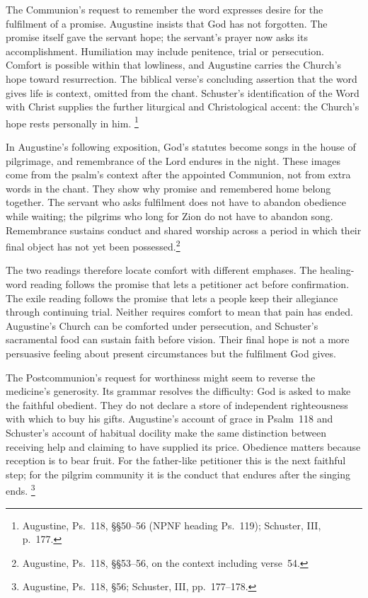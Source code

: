 The Communion's request to remember the word expresses desire for
the fulfilment of a promise. Augustine insists that God has not
forgotten. The promise itself gave the servant hope; the servant's
prayer now asks its accomplishment. Humiliation may include penitence,
trial or persecution. Comfort is possible within that lowliness,
and Augustine carries the Church's hope toward resurrection. The
biblical verse's concluding assertion that the word gives life is
context, omitted from the chant. Schuster's identification of the
Word with Christ supplies the further liturgical and Christological
accent: the Church's hope rests personally in him.
\footnote{Augustine, Ps.~118, \S\S50--56 (NPNF heading Ps.~119);
Schuster, III, p.~177.}

In Augustine's following exposition, God's statutes become songs in
the house of pilgrimage, and remembrance of the Lord endures in the
night. These images come from the psalm's context after the appointed
Communion, not from extra words in the chant. They show why promise
and remembered home belong together. The servant who asks fulfilment
does not have to abandon obedience while waiting; the pilgrims who
long for Zion do not have to abandon song. Remembrance sustains
conduct and shared worship across a period in which their final
object has not yet been possessed.\footnote{Augustine, Ps.~118,
\S\S53--56, on the context including verse~54.}

The two readings therefore locate comfort with different emphases.
The healing-word reading follows the promise that lets a petitioner
act before confirmation. The exile reading follows the promise that
lets a people keep their allegiance through continuing trial. Neither
requires comfort to mean that pain has ended. Augustine's Church can
be comforted under persecution, and Schuster's sacramental food can
sustain faith before vision. Their final hope is not a more persuasive
feeling about present circumstances but the fulfilment God gives.

The Postcommunion's request for worthiness might seem to reverse
the medicine's generosity. Its grammar resolves the difficulty:
God is asked to make the faithful obedient. They do not declare a
store of independent righteousness with which to buy his gifts.
Augustine's account of grace in Psalm~118 and Schuster's account of
habitual docility make the same distinction between receiving help
and claiming to have supplied its price. Obedience matters because
reception is to bear fruit. For the father-like petitioner this is
the next faithful step; for the pilgrim community it is the conduct
that endures after the singing ends.
\footnote{Augustine, Ps.~118, \S56; Schuster, III, pp.~177--178.}

